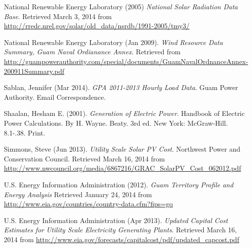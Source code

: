 \documentclass[12pt,letterpaper,fleqn]{report}
\begin{document}
\begin{thebibliography}{99}
  National Renewable Energy Laboratory (2005)
  \emph{National Solar Radiation Data Base}.
  Retrieved March 3, 2014 from
  \url{http://rredc.nrel.gov/solar/old_data/nsrdb/1991-2005/tmy3/}

  National Renewable Energy Laboratory (Jan 2009).
  \emph{Wind Resource Data Summary, Guam Naval Ordianance Annex}.
  Retrieved from
  \url{http://guampowerauthority.com/special/documents/GuamNavalOrdnanceAnnex-200911Summary.pdf}

  Sablan, Jennifer (Mar 2014).
  \emph{GPA 2011-2013 Hourly Load Data}.
  Guam Power Authority.
  Email Correspondence.

  Shaalan, Hesham E. (2001).
  \emph{Generation of Electric Power}.
  Handbook of Electric Power Calculations.
  By H. Wayne. Beaty.
  3rd ed. New York: McGraw-Hill.
  8.1-.38.
  Print.

  Simmons, Steve (Jun 2013).
  \emph{Utility Scale Solar PV Cost}.
  Northwest Power and Conservation Council.
  Retrieved March 16, 2014 from
  \url{http://www.nwcouncil.org/media/6867216/GRAC_SolarPV_Cost_062012.pdf}

  U.S. Energy Information Administration (2012).
  \emph{Guam Territory Profile and Energy Analysis}
  Retrieved January 24, 2014 from
  \url{http://www.eia.gov/countries/country-data.cfm?fips=gq}

  U.S. Energy Information Administration (Apr 2013).
  \emph{Updated Capital Cost Estimates for Utility Scale Electricity
    Generating Plants}.
  Retrieved March 16, 2014 from
  \url{http://www.eia.gov/forecasts/capitalcost/pdf/updated_capcost.pdf}

\end{thebibliography}
\end{document}
